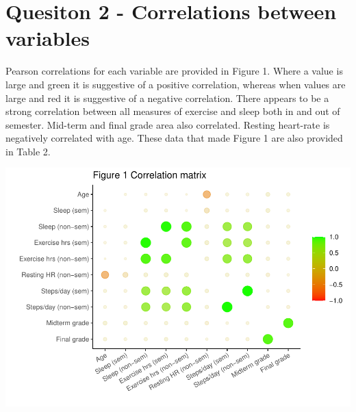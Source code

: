 \documentclass[preprint, 3p,
authoryear]{elsarticle} %
\begin{document}
\hypertarget{quesiton-2---correlations-between-variables}{%
\section{Quesiton 2 - Correlations between
variables}\label{quesiton-2---correlations-between-variables}}

Pearson correlations for each variable are provided in Figure 1. Where a
value is large and green it is suggestive of a positive correlation,
whereas when values are large and red it is suggestive of a negative
correlation. There appears to be a strong correlation between all
measures of exercise and sleep both in and out of semester. Mid-term and
final grade area also correlated. Resting heart-rate is negatively
correlated with age. These data that made Figure 1 are also provided in
Table 2.

\includegraphics{assignment_2_files/figure-latex/pressure-1.pdf}
\end{document}
